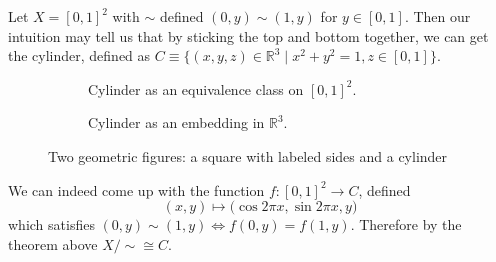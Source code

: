   \begin{example}[Cylinder]
    Let $X = [0, 1]^2$ with $\sim$ defined $(0, y) \sim (1, y)$ for $y \in [0, 1]$. Then our intuition may tell us that by sticking the top and bottom together, we can get the cylinder, defined as $C \equiv \{(x, y, z) \in \mathbb{R}^3 \mid x^2 + y^2 = 1, z \in [0,1]\}$.

    \begin{figure}[H]
      \centering
      \begin{subfigure}[b]{0.48\textwidth}
        \centering
        \caption{Cylinder as an equivalence class on $[0, 1]^2$.}
        \label{fig:cylinder_equiv}
      \end{subfigure}
      \hfill 
      \begin{subfigure}[b]{0.48\textwidth}
        \centering
        \caption{Cylinder as an embedding in $\mathbb{R}^3$. }
        \label{fig:cylinder_embed}
      \end{subfigure}
      \caption{Two geometric figures: a square with labeled sides and a cylinder}
      \label{fig:cylinder}
    \end{figure}
    
    We can indeed come up with the function $f: [0, 1]^2 \rightarrow C$, defined
    \begin{equation}
      (x, y) \mapsto \big( \cos{2\pi x}, \sin{2 \pi x}, y \big)
    \end{equation}
    which satisfies $(0, y) \sim (1, y) \iff f(0, y) = f(1, y)$. Therefore by the theorem above $X/{\sim} \cong C$. 
  \end{example}

